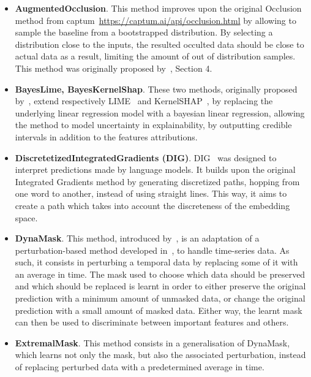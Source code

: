 \begin{itemize}
    \item \textbf{AugmentedOcclusion}.
        This method improves upon the original Occlusion method from captum~\url{https://captum.ai/api/occlusion.html}
        by allowing to sample the baseline from a bootstrapped distribution.
        By selecting a distribution close to the inputs, the resulted occulted data should be close to actual data as a
        result, limiting the amount of out of distribution samples.
        This method was originally proposed by~\citep{tonekaboni2020went}, Section 4.
    \item \textbf{BayesLime, BayesKernelShap}.
        These two methods, originally proposed by~\citep{slack2021reliable}, extend respectively
        LIME~\citep{ribeiro2016should} and KernelSHAP~\citep{lundberg2017unified}, by replacing the underlying
        linear regression model with a bayesian linear regression, allowing the method to model uncertainty in
        explainability, by outputting credible intervals in addition to the features attributions.
    \item \textbf{DiscretetizedIntegratedGradients (DIG)}.
        DIG~\citep{sanyal2021discretized} was designed to interpret predictions made by language models.
        It builds upon the original Integrated Gradients method by generating discretized paths, hopping from one
        word to another, instead of using straight lines.
        This way, it aims to create a path which takes into account the discreteness of the embedding space.
    \item \textbf{DynaMask}.
        This method, introduced by~\citep{crabbe2021explaining}, is an adaptation of a perturbation-based method
        developed in~\citep{fong2017interpretable, fong2019understanding}, to handle time-series data.
        As such, it consists in perturbing a temporal data by replacing some of it with an average in time.
        The mask used to choose which data should be preserved and which should be replaced is learnt in order to either
        preserve the original prediction with a minimum amount of unmasked data, or change the original prediction with
        a small amount of masked data.
        Either way, the learnt mask can then be used to discriminate between important features and others.
    \item \textbf{ExtremalMask}.
        This method consists in a generalisation of DynaMask, which learns not only the mask, but also the associated
        perturbation, instead of replacing perturbed data with a predetermined average in time.

\end{itemize}
